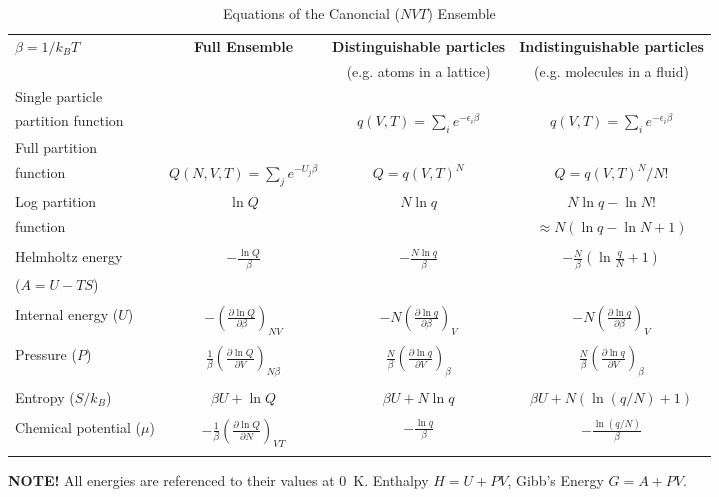 \documentclass[11pt]{article}
\begin{document}
\begin{table}\small
  \begin{center}
    \caption{Equations of the Canoncial ($NVT$) Ensemble}
    \label{Canonical}
    \begin{tabular}[H]{lccc}
      \hline
$\beta=1/k_BT$ & {\bf Full Ensemble} & {\bf Distinguishable particles} & {\bf Indistinguishable
particles} \\
               &               & (e.g. atoms in a lattice) & (e.g. molecules in
               a fluid) \\
\hline
Single particle & & & \\partition function& & $\displaystyle q(V,T) = \sum_i
e^{-\epsilon_i\beta} $& $\displaystyle q(V,T) = \sum_i e^{-\epsilon_i\beta} $ \\
Full partition & & & \\function & $\displaystyle Q(N,V,T) = \sum_j e^{-U_j\beta} $ &
$\displaystyle Q = q(V,T)^N $ & $\displaystyle Q = q(V,T)^N/N! $ \\
Log partition &  $\ln Q$ & $N\ln q$ & $ N\ln q - \ln N! $\\
function & & & $\approx N(\ln q - \ln N +1)$ \\ & & & \\
Helmholtz energy & $\displaystyle -\frac{\ln Q}{\beta}$ & $\displaystyle
-\frac{N\ln q}{\beta}$ & $\displaystyle -\frac{N}{\beta}\left (\ln\frac{q}{N} +
  1 \right ) $ \\
($A=U-TS$) & & & \\ & & &  \\
Internal energy ($U$)& $\displaystyle -\left (\frac{\partial\ln
    Q}{\partial\beta}\right )_{NV}$ & $\displaystyle -N\left (\frac{\partial\ln
    q}{\partial\beta}\right )_{V}$ &  $\displaystyle -N\left (\frac{\partial\ln
    q}{\partial\beta}\right )_{V}$ \\ & & & \\
Pressure ($P$) & $\displaystyle  \frac{1}{\beta}\left (\frac{\partial\ln
    Q}{\partial V}\right )_{N\beta}$ & $\displaystyle \frac{N}{\beta}\left (\frac{\partial\ln
    q}{\partial V}\right )_{\beta}$ &  $\displaystyle \frac{N}{\beta}\left (\frac{\partial\ln
    q}{\partial V}\right )_{\beta}$ \\ & & & \\

Entropy ($S/k_B$) & $ \beta U + \ln Q$ & $\beta U + N \ln q$ & $\beta U +
N\left ( \ln(q/N) + 1\right )$ \\ & & & \\
Chemical potential ($\mu$) & $\displaystyle -\frac{1}{\beta}\left ( \frac{\partial \ln
    Q}{\partial N}\right )_{VT} $& $\displaystyle -\frac{\ln q}{\beta}$ & $\displaystyle
-\frac{\ln (q/N)}{\beta}$ \\ & & & \\
\hline
    \end{tabular}
{\bf NOTE!} All energies are referenced to their values at 0~K.  Enthalpy $H=U+PV$, Gibb's
Energy $G=A+PV$.
  \end{center}
\end{table}
\end{document}
